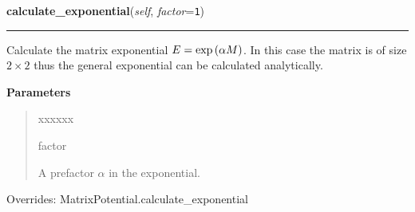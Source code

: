     \vspace{0.5ex}

\hspace{.8\funcindent}\begin{boxedminipage}{\funcwidth}

    \raggedright \textbf{calculate\_exponential}(\textit{self}, \textit{factor}={\tt 1})

    \vspace{-1.5ex}

    \rule{\textwidth}{0.5\fboxrule}
\setlength{\parskip}{2ex}
    Calculate the matrix exponential $E =
    \exp\left( \alpha M \right)$. In this case the
    matrix is of size $2 \times 2$ thus the general exponential can
    be calculated analytically.

\setlength{\parskip}{1ex}
      \textbf{Parameters}
      \vspace{-1ex}

      \begin{quote}
        \begin{Ventry}{xxxxxx}

          \item[factor]

          A prefactor $\alpha$ in the exponential.

        \end{Ventry}

      \end{quote}



      Overrides: MatrixPotential.calculate\_exponential

    \end{boxedminipage}

    \vspace{0.5ex}

